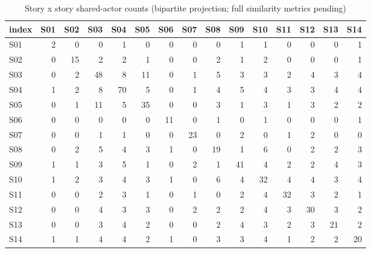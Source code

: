 \begin{table}
\caption{Story x story shared-actor counts (bipartite projection; full similarity metrics pending)}
\label{tab:t08_story_similarity}
\begin{tabular}{lrrrrrrrrrrrrrr}
\toprule
index & S01 & S02 & S03 & S04 & S05 & S06 & S07 & S08 & S09 & S10 & S11 & S12 & S13 & S14 \\
\midrule
S01 & 2 & 0 & 0 & 1 & 0 & 0 & 0 & 0 & 1 & 1 & 0 & 0 & 0 & 1 \\
S02 & 0 & 15 & 2 & 2 & 1 & 0 & 0 & 2 & 1 & 2 & 0 & 0 & 0 & 1 \\
S03 & 0 & 2 & 48 & 8 & 11 & 0 & 1 & 5 & 3 & 3 & 2 & 4 & 3 & 4 \\
S04 & 1 & 2 & 8 & 70 & 5 & 0 & 1 & 4 & 5 & 4 & 3 & 3 & 4 & 4 \\
S05 & 0 & 1 & 11 & 5 & 35 & 0 & 0 & 3 & 1 & 3 & 1 & 3 & 2 & 2 \\
S06 & 0 & 0 & 0 & 0 & 0 & 11 & 0 & 1 & 0 & 1 & 0 & 0 & 0 & 1 \\
S07 & 0 & 0 & 1 & 1 & 0 & 0 & 23 & 0 & 2 & 0 & 1 & 2 & 0 & 0 \\
S08 & 0 & 2 & 5 & 4 & 3 & 1 & 0 & 19 & 1 & 6 & 0 & 2 & 2 & 3 \\
S09 & 1 & 1 & 3 & 5 & 1 & 0 & 2 & 1 & 41 & 4 & 2 & 2 & 4 & 3 \\
S10 & 1 & 2 & 3 & 4 & 3 & 1 & 0 & 6 & 4 & 32 & 4 & 4 & 3 & 4 \\
S11 & 0 & 0 & 2 & 3 & 1 & 0 & 1 & 0 & 2 & 4 & 32 & 3 & 2 & 1 \\
S12 & 0 & 0 & 4 & 3 & 3 & 0 & 2 & 2 & 2 & 4 & 3 & 30 & 3 & 2 \\
S13 & 0 & 0 & 3 & 4 & 2 & 0 & 0 & 2 & 4 & 3 & 2 & 3 & 21 & 2 \\
S14 & 1 & 1 & 4 & 4 & 2 & 1 & 0 & 3 & 3 & 4 & 1 & 2 & 2 & 20 \\
\bottomrule
\end{tabular}
\end{table}
